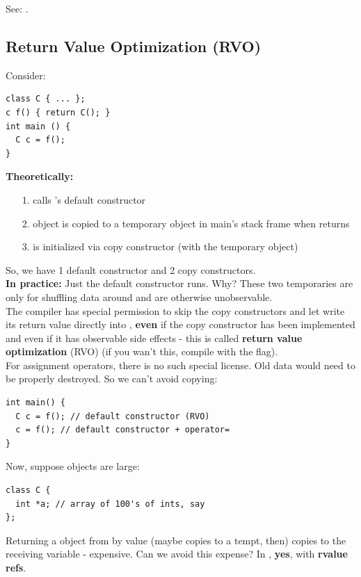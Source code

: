 \documentclass[english, 11pt]{article}
\begin{document}
See: .

\subsection{Return Value Optimization (RVO)}

Consider:

\begin{lstlisting}
class C { ... };
c f() { return C(); }
int main () {
  C c = f();
}
\end{lstlisting}

\textbf{Theoretically:}
\begin{itemize}
  \item[1.]  calls 's default constructor
  \item[2.]  object is copied to a temporary object in main's stack frame when  returns
  \item[3.]  is initialized via copy constructor (with the temporary object)
\end{itemize}

So, we have 1 default constructor and 2 copy constructors. \\

\textbf{In practice:} Just the default constructor runs. Why? These two temporaries are only for shuffling data around and are otherwise unobservable. \\

The compiler has special permission to skip the copy constructors and let  write its return value directly into , \textbf{even} if the copy constructor has been implemented and even if it has observable side effects - this is called \textbf{return value optimization} (RVO) (if you wan't this, compile with the  flag). \\

For assignment operators, there is no such special license. Old data would need to be properly destroyed. So we can't avoid copying:
\begin{lstlisting}
int main() {
  C c = f(); // default constructor (RVO)
  c = f(); // default constructor + operator=
}
\end{lstlisting}
Now, suppose  objects are large:

\begin{lstlisting}
class C {
  int *a; // array of 100's of ints, say
};
\end{lstlisting}
Returning a  object from  by value (maybe copies to a tempt, then) copies to the receiving variable - expensive. Can we avoid this expense? In , \textbf{yes}, with \textbf{rvalue refs}. \\
\end{document}
